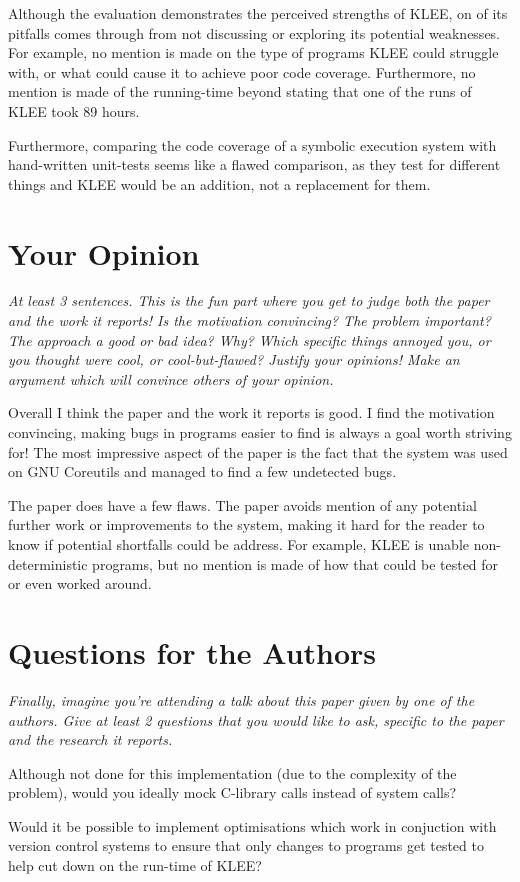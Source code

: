\documentclass[11pt]{article}
\begin{document}
Although the evaluation demonstrates the perceived strengths of KLEE, on of its
pitfalls comes through from not discussing or exploring its potential
weaknesses. For example, no mention is made on the type of programs KLEE could
struggle with, or what could cause it to achieve poor code coverage.
Furthermore, no mention is made of the running-time beyond stating that one of
the runs of KLEE took 89 hours.

Furthermore, comparing the code coverage of a symbolic execution system with
hand-written unit-tests seems like a flawed comparison, as they test for
different things and KLEE would be an addition, not a replacement for them.

\section*{Your Opinion}

\textsl{At least 3 sentences. This is the fun part where you get to judge both
the paper and the work it reports! Is the motivation convincing? The problem
important? The approach a good or bad idea? Why? Which specific things annoyed
you, or you thought were cool, or cool-but-flawed? Justify your opinions! Make
an argument which will convince others of your opinion.}

Overall I think the paper and the work it reports is good. I find the
motivation convincing, making bugs in programs easier to find is always a goal
worth striving for! The most impressive aspect of the paper is the fact that
the system was used on GNU Coreutils and managed to find a few undetected bugs.

The paper does have a few flaws. The paper avoids mention of any potential
further work or improvements to the system, making it hard for the reader to
know if potential shortfalls could be address. For example, KLEE is unable
non-deterministic programs, but no mention is made of how that could be tested
for or even worked around.

\section*{Questions for the Authors}

\textsl{Finally, imagine you're attending a talk about this paper given by one
of the authors. Give at least 2 questions that you would like to ask, specific
to the paper and the research it reports.}

Although not done for this implementation (due to the complexity of the
problem), would you ideally mock C-library calls instead of system calls?

Would it be possible to implement optimisations which work in conjuction with
version control systems to ensure that only changes to programs get tested to
help cut down on the run-time of KLEE?




\end{document}
